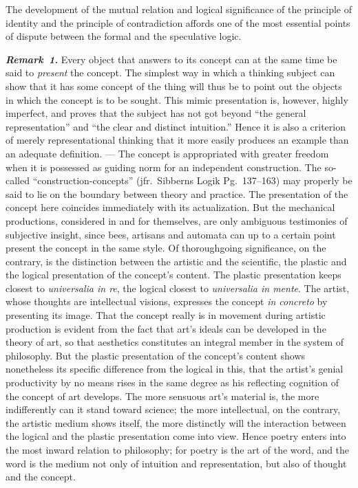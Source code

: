 \documentclass[12pt]{book}
\newcommand{\anm}[1]{\emph{\textbf{Remark~#1.}}}
\begin{document}
The development of the mutual relation and logical significance of the
principle of identity and the principle of contradiction affords one of the
most essential points of dispute between the formal and the speculative
logic.

\anm{1} Every object that answers to its concept can at the same time be
said to \emph{present} the concept. The simplest way in which a thinking
subject can show that it has some concept of the thing will thus be to
point out the objects in which the concept is to be sought. This mimic
presentation is, however, highly imperfect, and proves that the subject has
not got beyond ``the general representation'' and ``the clear and distinct
intuition.'' Hence it is also a criterion of merely representational
thinking that it more easily produces an example than an adequate
definition. --- The concept is appropriated with greater freedom when it is
possessed as guiding norm for an independent construction. The so-called
``construction-concepts'' (jfr.\ Sibberns Logik Pg.\ 137--163) may properly
be said to lie on the boundary between theory and practice. The presentation
of the concept here coincides immediately with its actualization. But the
mechanical productions, considered in and for themselves, are only ambiguous
testimonies of subjective insight, since bees, artisans and automata can up
to a certain point present the concept in the same style. Of thoroughgoing
significance, on the contrary, is the distinction between the artistic and
the scientific, the plastic and the logical presentation of the concept's
content. The plastic presentation keeps closest to \textit{universalia in
re}, the logical closest to \textit{universalia in mente}. The artist, whose
thoughts are intellectual visions, expresses the concept \textit{in
concreto} by presenting its image. That the concept really is in movement
during artistic production is evident from the fact that art's ideals can be
developed in the theory of art, so that aesthetics constitutes an integral
member in the system of philosophy. But the plastic presentation of the
concept's content shows nonetheless its specific difference from the logical
in this, that the artist's genial productivity by no means rises in the same
degree as his reflecting cognition of the concept of art develops. The more
sensuous art's material is, the more indifferently can it stand toward
science; the more intellectual, on the contrary, the artistic medium shows
itself, the more distinctly will the interaction between the logical and the
plastic presentation come into view. Hence poetry enters into the most
inward relation to philosophy; for poetry is the art of the word, and the
word is the medium not only of intuition and representation, but also of
thought and the concept.
\end{document}
